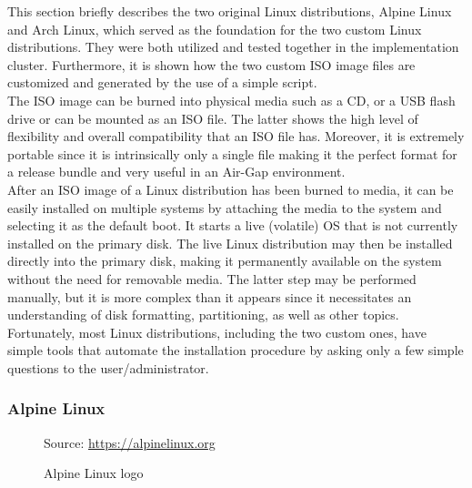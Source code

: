This section briefly describes the two original Linux distributions, Alpine
Linux and Arch Linux, which served as the foundation for the two custom Linux distributions.
They were both utilized and tested together in the implementation cluster. Furthermore,
it is shown how the two custom ISO image files are customized and generated by
the use of a simple script. \\ %
The ISO image can be burned into physical media such as a CD, or a USB flash drive
or can be mounted as an ISO file. The latter shows the high level of flexibility
and overall compatibility that an ISO file has. Moreover, it is extremely
portable since it is intrinsically only a single file making it the perfect
format for a release bundle and very useful in an Air-Gap environment. \\ %
After an ISO image of a Linux distribution has been burned to media, it can be easily
installed on multiple systems by attaching the media to the system and selecting
it as the default boot. It starts a live (volatile) OS that is not currently
installed on the primary disk. The live Linux distribution may then be installed
directly into the primary disk, making it permanently available on the system
without the need for removable media. The latter step may be performed manually,
but it is more complex than it appears since it necessitates an understanding of
disk formatting, partitioning, as well as other topics. Fortunately, most Linux
distributions, including the two custom ones, have simple tools that automate
the installation procedure by asking only a few simple questions to the user/administrator.

\subsubsection{Alpine Linux}
\label{subsubsec:implementation_distributions_iso_alpine_linux}

\begin{figure} %
  \centering
  \def\stackalignment{r} %
  {\scriptsize \parbox[t]{\linewidth}{ Source: \url{https://alpinelinux.org}} }
  \caption{Alpine Linux logo}
\end{figure}

